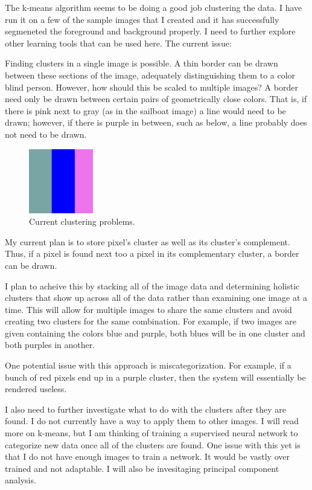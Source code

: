 \documentclass[12pt]{article}
\begin{document}
The k-means algorithm seems to be doing a good job clustering the data. I have run it on a few of the sample images that I created and it has successfully segmeneted the foreground and background properly. I need to further explore other learning tools that can be used here. The current issue:

Finding clusters in a single image is possible. A thin border can be drawn between these sections of the image, adequately distinguishing them to a color blind person. However, how should this be scaled to multiple images? A border need only be drawn between certain pairs of geometrically close colors. That is, if there is pink next to gray (as in the sailboat image) a line would need to be drawn; however, if there is purple in between, such as below, a line probably does not need to be drawn.

\begin{figure}[H]
	\centering
	\includegraphics[width=0.25\textwidth]{img/graypurplepink.png}
	\caption{Current clustering problems.}
	\label{fig:kmeans2}
\end{figure}
 
My current plan is to store pixel's cluster as well as its cluster's complement. Thus, if a pixel is found next too a pixel in its complementary cluster, a border can be drawn. 

I plan to acheive this by stacking all of the image data and determining holistic clusters that show up across all of the data rather than examining one image at a time. This will allow for multiple images to share the same clusters and avoid creating two clusters for the same combination. For example, if two images are given containing the colors blue and purple, both blues will be in one cluster and both purples in another.

One potential issue with this approach is miscategorization. For example, if a bunch of red pixels end up in a purple cluster, then the system will essentially be rendered useless.

I also need to further investigate what to do with the clusters after they are found. I do not currently have a way to apply them to other images. I will read more on k-means, but I am thinking of training a supervised neural network to categorize new data once all of the clusters are found. One issue with this yet is that I do not have enough images to train a network. It would be vastly over trained and not adaptable. I will also be invesitaging principal component analysis.
\end{document}

